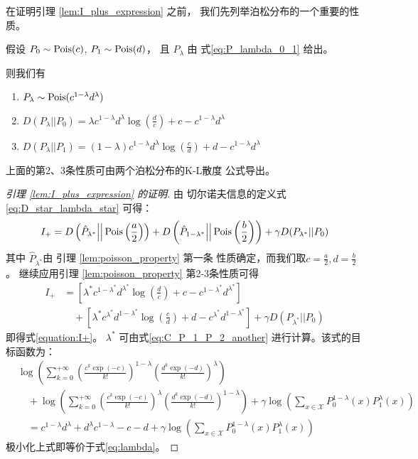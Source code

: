 在证明引理
 \ref{lem:I_plus_expression}   之前，
我们先列举泊松分布的一个重要的性质。
\begin{lemma}\label{lem:poisson_property}
假设 $P_0 \sim \operatorname{Pois}(c)$, $P_1 \sim \operatorname{Pois}(d)$，
且 $P_{\lambda}$ 由 式\eqref{eq:P_lambda_0_1}
给出。

则我们有
\begin{enumerate}
    \item $P_{\lambda} \sim \operatorname{Pois}(c^{1-\lambda} d^{\lambda})$
    \item $D(P_{\lambda}||P_0) = 
    \lambda c^{1-\lambda}d^{\lambda}\log(\frac{d}{c}) + c-c^{1-\lambda}d^{\lambda}$
    \item $D(P_{\lambda}||P_1) = (1-\lambda)
    c^{1-\lambda}d^{\lambda}\log(\frac{c}{d})
    + d-c^{1-\lambda}d^{\lambda}$
\end{enumerate}
\end{lemma}
上面的第2、3条性质可由两个泊松分布的K-L散度
公式导出。
\begin{proof}[引理 \ref{lem:I_plus_expression} 的证明]
由 切尔诺夫信息的定义式 \eqref{eq:D_star_lambda_star} 
可得：
$$
I_+ = D\left(\hat{P}_{\lambda^*} \Big|\Big| \operatorname{Pois}\left(\frac{a}{2}\right) \right)
+ D\left(\hat{P}_{1-\lambda^*} \Big|\Big| \operatorname{Pois}\left(\frac{b}{2}\right) \right)
+ \gamma D(P_{\lambda^*} || P_0)
$$
其中 $\hat{P}_{\lambda^*}$由
引理 \ref{lem:poisson_property} 第一条
性质确定，而我们取$c=\frac{a}{2}, d=\frac{b}{2}$。
继续应用引理 \ref{lem:poisson_property} 第2-3条性质可得
\begin{align*}
    I_+ &= \left[\lambda^* c^{1-\lambda^*}d^{\lambda^*}
    \log \left(\frac{d}{c} \right)+ c-c^{1-\lambda^*}d^{\lambda^*}
    \right] \\
&\quad + \left[\lambda^* c^{\lambda^*}d^{1-\lambda^*}\log \left(\frac{c}{d} \right)
+ d - c^{\lambda^*}d^{1-\lambda^*}\right]
+ \gamma D(P_{\lambda^*} || P_0)
\end{align*}
即得式\eqref{equation:I+}。
$\lambda^*$ 可由式\eqref{eq:C_P_1_P_2_another} 
进行计算。该式的目标函数为：
\begin{align*}
&\log\left(\sum_{k=0}^{+\infty} \left(\frac{c^k\exp(-c)}{k!}
\right)^{1-\lambda}
\left(\frac{d^k\exp(-d)}{k!} \right)^{\lambda}
\right) \\
&\quad + \log\left(\sum_{k=0}^{+\infty} \left(\frac{c^k\exp(-c)}{k!}
\right)^{\lambda}
\left(\frac{d^k\exp(-d)}{k!} \right)^{1-\lambda}
\right)+
\gamma\log \left(\sum_{x\in \mathcal{X}}P^{1-\lambda}_0(x) P^{\lambda}_1(x)
\right)\\
&\quad = c^{1-\lambda} d^{\lambda} 
+ d^{\lambda} c^{1-\lambda} -c -d +
\gamma\log \left(\sum_{x\in \mathcal{X}}P^{1-\lambda}_0(x) P^{\lambda}_1(x)
\right)
\end{align*}
极小化上式即等价于式\eqref{eq:lambda}。
\end{proof}

